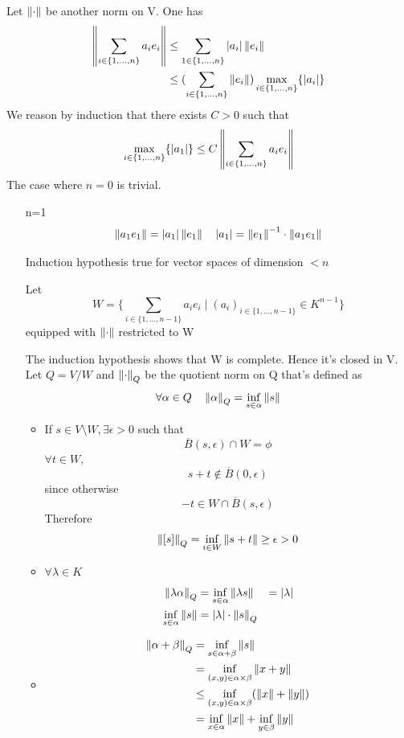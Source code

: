 \documentclass{book}
\newcommand{\abs}[1]{\left\lvert #1 \right\rvert}
\begin{document}
Let $\left\lVert \cdot \right\rVert$ be another norm on V. One has $$
\begin{aligned}
\norm{\sum\limits_{i\in \{1,...,n\}}a_ie_i}
&\leq \sum\limits_{1\in \{1,...,n\}}\abs{a_i}\norm{e_i}\\
&\leq (\sum\limits_{i\in \{1,...,n\}}\norm{e_i})\max\limits_{i\in \{1,...,n\}}\{\abs{a_i}\}\end{aligned}
$$
We reason by induction that there exists $C>0$ such that $$\max\limits_{i\in \{1,...,n\}}\{\abs{a_1}\}\leq C\norm{\sum\limits_{i\in \{1,...,n\}}a_ie_i}$$ The case where $n=0$ is trivial.
\begin{itemize}
    \item [n=1]$$\norm{a_1e_1}=\abs{a_1}\norm{e_1}\quad \abs{a_1}=\norm{e_1}^{-1}\cdot\norm{a_1e_1}$$
    \item [Induction hypothesis] true for vector spaces of dimension $<n$ 
    
    Let $$W=\{\sum\limits_{i\in \{1,...,n-1\}}a_ie_i\mid(a_i)_{i\in \{1,...,n-1\}}\in K^{n-1}\}$$equipped with $\left\lVert \cdot \right\rVert$ restricted to W

    The induction hypothesis shows that W is complete. Hence it's closed in V. Let $Q=V/W$ and $\left\lVert \cdot \right\rVert_Q$ be the quotient norm on Q that's defined as $$\forall \alpha\in Q\quad \left\lVert \alpha \right\rVert _Q=\inf\limits_{s\in \alpha}\left\lVert s \right\rVert$$
    \begin{itemize}
        \item If $s\in V\setminus W, \exists \epsilon>0$ such that $$\overline{B}(s,\epsilon)\cap W=\phi$$
        $\forall t\in W,$$$s+t\not\in \overline{B}(0,\epsilon)$$ since otherwise $$-t\in W\cap \overline{B}(s,\epsilon)$$
        Therefore $$\left\lVert [s] \right\rVert_Q=\inf\limits_{i\in W}\left\lVert s+t \right\rVert\geq \epsilon>0$$
        \item $\forall\lambda\in K$$$\begin{aligned}
            \norm{\lambda\alpha}_Q &= \inf\limits_{s\in \alpha}\norm{\lambda s} &= \abs{\lambda}\\
            \inf\limits_{s\in \alpha}\norm{s} &=\abs{\lambda}\cdot\norm{s}_Q
        \end{aligned}$$
        \item $$\begin{aligned}
            \left\lVert \alpha+\beta \right\rVert_Q &=\inf\limits_{s\in \alpha+\beta}\left\lVert s \right\rVert\\
            &= \inf\limits_{(x,y)\in \alpha\times\beta}\left\lVert x+y \right\rVert\\
            &\leq \inf\limits_{(x,y)\in \alpha\times\beta}(\left\lVert x \right\rVert+\left\lVert y \right\rVert)\\
            &= \inf\limits_{x\in \alpha}\left\lVert x \right\rVert+\inf\limits_{y\in \beta}\left\lVert y \right\rVert
        \end{aligned}$$
    \end{itemize}


\end{itemize}
\end{document}
